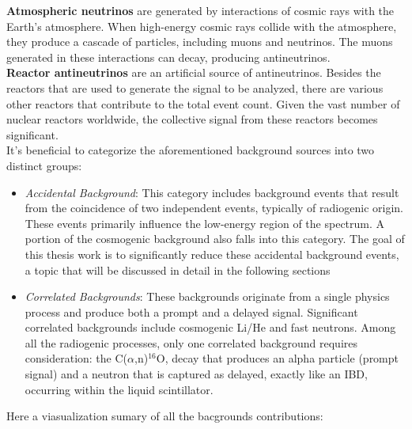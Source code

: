 \textbf{Atmospheric neutrinos} are generated by interactions of cosmic rays with the Earth's atmosphere. When high-energy cosmic rays collide with the atmosphere, they produce a cascade of particles, including muons and neutrinos. The muons generated in these interactions can decay, producing antineutrinos.\\

\textbf{Reactor antineutrinos} are an artificial source of antineutrinos. Besides the reactors that are used to generate the signal to be analyzed, there are various other reactors that contribute to the total event count. Given the vast number of nuclear reactors worldwide, the collective signal from these reactors becomes significant.\\




It's beneficial to categorize the aforementioned background sources into two distinct groups:

\begin{itemize}
	\item \textit{Accidental Background}: This category includes background events that result from the coincidence of two independent events, typically of radiogenic origin. These events primarily influence the low-energy region of the spectrum. A portion of the cosmogenic background also falls into this category. The goal of this thesis work is to significantly reduce these accidental background events, a topic that will be discussed in detail in the following sections
	\item \textit{Correlated Backgrounds}: These backgrounds originate from a single physics process and produce both a prompt and a delayed signal. Significant correlated backgrounds include cosmogenic Li/He and fast neutrons. Among all the radiogenic processes, only one correlated background requires consideration: the $\mathrm{C}$($\alpha$,n)$^{16}\mathrm{O}$, decay that produces an alpha particle (prompt signal) and a neutron that is captured as delayed, exactly like an IBD, occurring within the liquid scintillator.
\end{itemize}
 





Here a viasualization sumary of all the bacgrounds contributions:

